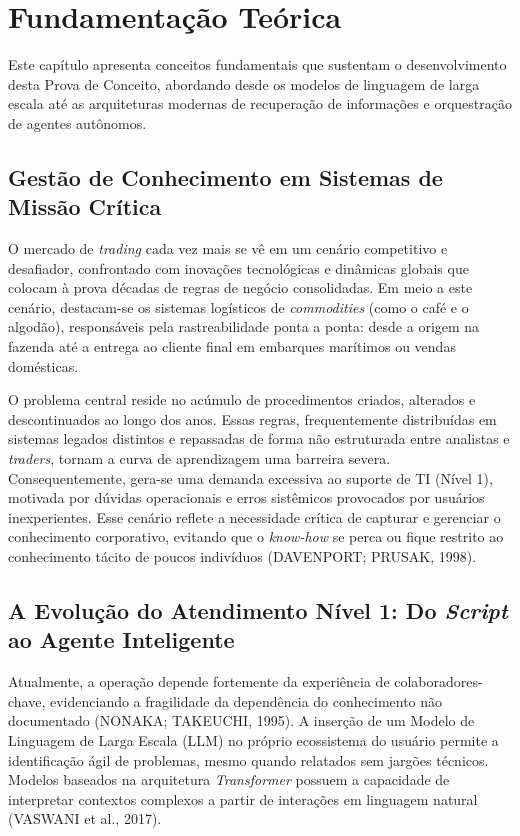 \chapter{Fundamentação Teórica} \label{Cap:Fund_Teo}

Este capítulo apresenta conceitos fundamentais que sustentam o desenvolvimento desta Prova de Conceito, abordando desde os modelos de linguagem de larga escala até as arquiteturas modernas de recuperação de informações e orquestração de agentes autônomos.

\section{Gestão de Conhecimento em Sistemas de Missão Crítica}

O mercado de \textit{trading} cada vez mais se vê em um cenário competitivo e desafiador, confrontado com inovações tecnológicas e dinâmicas globais que colocam à prova décadas de regras de negócio consolidadas. Em meio a este cenário, destacam-se os sistemas logísticos de \textit{commodities} (como o café e o algodão), responsáveis pela rastreabilidade ponta a ponta: desde a origem na fazenda até a entrega ao cliente final em embarques marítimos ou vendas domésticas.

O problema central reside no acúmulo de procedimentos criados, alterados e descontinuados ao longo dos anos. Essas regras, frequentemente distribuídas em sistemas legados distintos e repassadas de forma não estruturada entre analistas e \textit{traders}, tornam a curva de aprendizagem uma barreira severa. Consequentemente, gera-se uma demanda excessiva ao suporte de TI (Nível 1), motivada por dúvidas operacionais e erros sistêmicos provocados por usuários inexperientes. Esse cenário reflete a necessidade crítica de capturar e gerenciar o conhecimento corporativo, evitando que o \textit{know-how} se perca ou fique restrito ao conhecimento tácito de poucos indivíduos (DAVENPORT; PRUSAK, 1998).

\section{A Evolução do Atendimento Nível 1: Do \textit{Script} ao Agente Inteligente}

Atualmente, a operação depende fortemente da experiência de colaboradores-chave, evidenciando a fragilidade da dependência do conhecimento não documentado (NONAKA; TAKEUCHI, 1995). A inserção de um Modelo de Linguagem de Larga Escala (LLM) no próprio ecossistema do usuário permite a identificação ágil de problemas, mesmo quando relatados sem jargões técnicos. Modelos baseados na arquitetura \textit{Transformer} possuem a capacidade de interpretar contextos complexos a partir de interações em linguagem natural (VASWANI et al., 2017).

